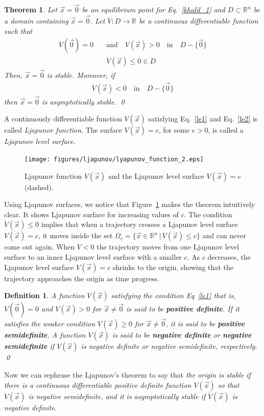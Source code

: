 \documentclass[11pt,a4paper,oneside]{book}
\numberwithin{equation}{section}
\theoremstyle{it}
\newtheorem{defn}{Definition}[chapter]
\newtheorem{thm}{Theorem}[chapter]
\theoremstyle{definition}
\begin{document}
\begin{thm}
	Let $\vec{x}=\vec{0}$ be an equilibrium point for Eq.~\eqref{khalil_1} and 
	$D\subset\mathbb{R}^n$ be a domain containing $\vec{x}=\vec{0}$. Let 
	$V:D\rightarrow\mathbb{R}$ be a continuous differentiable function such 
	that 
	\begin{equation}\label{le1}
		\begin{aligned}
			V(\vec{0}) = 0 \quad &\text{and}\quad 
			V(\vec{x})>0\quad\text{in}\quad D-\{\vec{0}\} \\[6pt]
			&\dot{V}(\vec{x})\le0\in D
		\end{aligned}
	\end{equation}
	Then, $\vec{x}=\vec{0}$ is stable. Moreover, if
	\begin{equation}\label{le2}
		\begin{aligned}
			\dot{V}(\vec{x})<0\quad\text{in}\quad D-\{\vec{0}\}
		\end{aligned}
	\end{equation}
	then $\vec{x}=\vec{0}$ is asymptotically stable.
	\qed
\end{thm}
A continuously differentiable function $V(\vec{x})$ satisfying Eq.~\eqref{le1} 
and Eq.~\eqref{le2} is called \textit{Ljapunov function}. The surface 
$V(\vec{x})=c$, for some $c>0$, is called a \textit{Ljapunov level surface}. 
\begin{figure}[H]
	\centering
	\texttt{[image: figures/ljapunov/lyapunov\_function\_2.eps]}
	\captionsetup{width=0.75\textwidth}		
	\caption{Ljapunov function $V(\vec{x})$ and the Ljapunov level surface 
	$V(\vec{x})=c$ (dashed).}
	\label{figure_lypf}
\end{figure}
Using Ljapunov surfaces, we notice that Figure~\ref{figure_lypf} makes the 
theorem intuitively clear. It shows Ljapunov surface for increasing values of 
$c$. The condition $\dot{V}(\vec{x})\le0$ implies that when a trajectory 
crosses a Ljapunov level surface $V(\vec{x})=c$, it moves inside the set 
$\Omega_c=\Big\{ \vec{x}\in\mathbb{R}^n\,|\,V(\vec{x})\le c\Big\}$ and can 
never come out again. When $\dot{V}<0$ the trajectory moves from one Ljapunov 
level surface to an inner Ljapunov level surface with a smaller $c$. As $c$ 
decreases, the Ljapunov level surface $V(\vec{x})=c$ shrinks to the origin, 
showing that the trajectory approaches the origin as time progress. 
\begin{defn}
	A function $V(\vec{x})$ satisfying the condition Eq~\ref{le1} that is, 
	$V(\vec{0})=0$ and $V(\vec{x})>0$ for $\vec{x}\ne\vec{0}$ is said to be 
	\textbf{positive definite}. If it satisfies the weaker condition 
	$V(\vec{x})\ge0$ for $\vec{x}\ne\vec{0}$, it is said to be \textbf{positive 
	semidefinite}. A function $V(\vec{x})$ is said to be \textbf{negative 
	definite} or \textbf{negative semidefinite} if $V(\vec{x})$ is negative 
	definite or negative semidefinite, respectively.
	\qed
\end{defn}
Now we can rephrase the Ljapunov's theorem to say that \textit{the origin is 
stable if there is a continuous differentiable positive definite function 
$V(\vec{x})$ so that $\dot{V}(\vec{x})$ is negative semidefinite, and it is 
asymptotically stable if $\dot{V}(\vec{x})$ is negative definite}.
\end{document}
